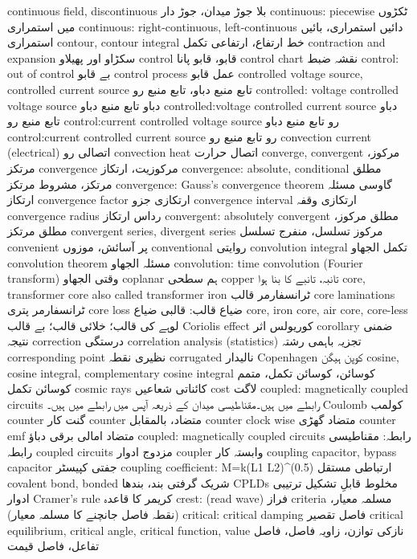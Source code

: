 continuous field, discontinuous	بلا جوڑ میدان، جوڑ دار
continuous: piecewise	ٹکڑوں میں استمراری
continuous: right-continuous, left-continuous	دائیں استمراری، بائیں استمراری
contour, contour integral	خط ارتفاع، ارتفاعی تکمل
contraction and expansion	سکڑاو اور پھیلاو
control	قابو، قابو پانا
control chart	نقشہ ضبط
control: out of control	بے قابو
control process	عمل قابو
controlled voltage source, controlled current source	تابع منبع دباو، تابع منبع رو
controlled: voltage controlled voltage source	دباو تابع منبع دباو
controlled:voltage controlled current source	دباو تابع منبع رو
control:current controlled voltage source	رو تابع منبع دباو
control:current controlled current source	رو تابع منبع رو
convection current (electrical)	اتصالی رو
convection heat	اتصال حرارت
converge, convergent	مرکوز، مرتکز
convergence	مرکوزیت، ارتکاز
convergence: absolute, conditional	مطلق مرتکز، مشروط مرتکز
convergence: Gauss's convergence theorem	گاوسی مسئلہ ارتکاز
convergence factor	ارتکازی جزو
convergence interval	ارتکازی وقفہ
convergence radius	رداس ارتکاز
convergent: absolutely convergent	مطلق مرکوز، مطلق مرتکز
convergent series, divergent series	مرکوز تسلسل، منفرج تسلسل
convenient	پر آسائش، موزوں
conventional	روایتی
convolution integral	تکمل الجھاو
convolution theorem	مسئلہ الجھاو
convolution: time convolution (Fourier transform)	وقتی الجھاو
coplanar	ہم سطحی
copper	تانبہ، تانبے کا بنا ہوا
core, transformer core also called transformer iron	ٹرانسفارمر قالب
core laminations	ٹرانسفارمر پتری
core loss	ضیاع قالب: قالبی ضیاع
core, iron core, air core, core-less	لوہے کی قالب؛ خلائی قالب؛ بے قالب
Coriolis effect	کوریولس اثر
corollary	ضمنی نتیجہ
correction	درستگی
correlation analysis (statistics)	تجزیہ باہمی رشتہ
corresponding point	نظیری نقطہ
corrugated	نالیدار
Copenhagen	کوپن ہیگن
cosine, cosine integral, complementary cosine integral	کوسائن، کوسائن تکمل، متمم کوسائن تکمل
cosmic rays	کائناتی شعاعیں
cost	لاگت
coupled: magnetically coupled circuits	رابطے میں ہیں۔مقناطیسی میدان کے ذریعہ آپس میں رابطے میں ہیں۔
Coulomb	کولمب
counter	گنت کار
counter	متضاد، بالمقابل
counter clock wise	متضاد گھڑی
counter emf	متضاد امالی برقی دباؤ
coupled: magnetically coupled circuits	رابطہ: مقناطیسی رابطہ
coupled circuits	مزدوج ادوار
coupler	وابستہ کار
coupling capacitor, bypass capacitor	جفتی کپیسٹر 
coupling coefficient: M=k(L1 L2)^(0.5)	ارتباطی مستقل
covalent bond, bonded	شریک گرفتی بند، بندھا
CPLDs	مخلوط قابلِ تشکیل ترتیبی ادوار
Cramer's rule	کریمر کا قاعدہ
crest: (read wave)	فراز
criteria	مسلمہ معیار، (نقطہ فاصل جانچنے کا مسلمہ معیار)
critical: critical damping	فاصل تقصیر
critical equilibrium, critical angle, critical function, value	نازکی توازن، زاویہ فاصل، فاصل تفاعل، فاصل قیمت
